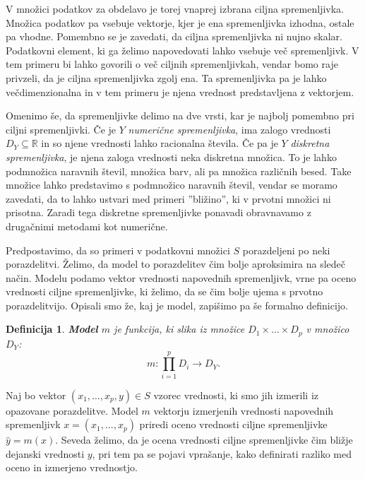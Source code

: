 \documentclass[12pt,a4paper]{article}
\newtheorem{definicija}{Definicija}
\begin{document}
V množici podatkov za obdelavo je torej vnaprej izbrana ciljna spremenljivka. 
Množica podatkov pa vsebuje vektorje, kjer je ena spremenljivka izhodna, ostale pa vhodne. 
Pomembno se je zavedati, da ciljna spremenljivka ni nujno skalar. 
Podatkovni element, ki ga želimo napovedovati lahko vsebuje več spremenljivk. 
V tem primeru bi lahko govorili o več ciljnih spremenljivkah, vendar bomo raje privzeli, da je ciljna spremenljivka zgolj ena. 
Ta spremenljivka pa je lahko večdimenzionalna in v tem primeru je njena vrednost predstavljena z vektorjem.


Omenimo še, da spremenljivke delimo na dve vrsti, kar je najbolj pomembno pri ciljni spremenljivki. Če je $Y$ \emph{numerične spremenljivka}, ima zalogo vrednosti $D_Y \subseteq \mathbb{R}$ in so njene vrednosti lahko racionalna števila. Če pa je $Y$ \emph{diskretna spremenljivka}, je njena zaloga vrednosti neka diskretna množica. To je lahko podmnožica naravnih števil, množica barv, ali pa množica različnih besed. Take množice lahko predstavimo s podmnožico naravnih števil, vendar se moramo zavedati, da to lahko ustvari med primeri ''bližino'', ki v prvotni množici ni prisotna. Zaradi tega diskretne spremenljivke ponavadi obravnavamo z drugačnimi metodami kot numerične.

Predpostavimo, da so primeri v podatkovni množici $S$ porazdeljeni po neki porazdelitvi. Želimo, da model to porazdelitev čim bolje aproksimira na sledeč način. Modelu podamo vektor vrednosti napovednih spremenljivk, vrne pa oceno vrednosti ciljne spremenljivke, ki želimo, da se čim bolje ujema s prvotno porazdelitvijo. Opisali smo že, kaj je model, zapišimo pa še formalno definicijo.

\begin{definicija}
\textbf{Model} $m$ je funkcija, ki slika iz množice $D_1 \times \ldots \times D_p$ v množico $D_Y$:
$$
m: \prod_{i=1}^p D_i \rightarrow D_Y.
$$
\end{definicija}

Naj bo vektor $(x_1, \ldots, x_p, y) \in S$ vzorec vrednosti, ki smo jih izmerili iz opazovane porazdelitve. Model $m$ vektorju izmerjenih vrednosti napovednih spremenljivk $x=(x_1, \ldots, x_p)$ priredi oceno vrednosti ciljne spremenljivke $\hat{y}=m(x)$. Seveda želimo, da je ocena vrednosti ciljne spremenljivke čim bližje dejanski vrednosti $y$, pri tem pa se pojavi vprašanje, kako definirati razliko med oceno in izmerjeno vrednostjo.
\end{document}
